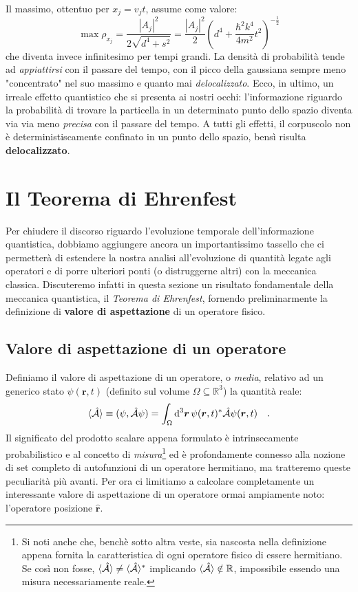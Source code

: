 Il massimo, ottentuo per $x_j = v_jt$, assume come valore:
\[
    \max{\rho_{x_j}} = \frac{|A_j|^2}{{2\sqrt{d^4+s^2}}} = \frac{|A_j|^2}{2} \left( d^4 + \frac{\hbar^2k^4}{4m^2}t^2 \right)^{-\frac{1}{2}} 
\]
che diventa invece infinitesimo per tempi grandi. La densità di probabilità tende ad \emph{appiattirsi} con il passare del tempo, con il picco della gaussiana sempre meno "concentrato" nel suo massimo e quanto mai \emph{delocalizzato}. Ecco, in ultimo, un irreale effetto quantistico che si presenta ai nostri occhi: l'informazione riguardo la probabilità di trovare la particella in un determinato punto dello spazio diventa via via meno \emph{precisa} con il passare del tempo. A tutti gli effetti, il corpuscolo non è deterministiscamente confinato in un punto dello spazio, bensì risulta \textbf{delocalizzato}.

\section{Il Teorema di Ehrenfest}
Per chiudere il discorso riguardo l'evoluzione temporale dell'informazione quantistica, dobbiamo aggiungere ancora un importantissimo tassello che ci permetterà di estendere la nostra analisi all'evoluzione di quantità legate agli operatori e di porre ulteriori ponti (o distruggerne altri) con la meccanica classica. Discuteremo infatti in questa sezione un risultato fondamentale della meccanica quantistica, il \textit{Teorema di Ehrenfest}, fornendo preliminarmente la definizione di \textbf{valore di aspettazione} di un operatore fisico.

\subsection{Valore di aspettazione di un operatore}
Definiamo il {valore di aspettazione} di un operatore, o \emph{media}, relativo ad un generico stato $\psi(\bm{r},t)$ (definito sul volume $\Omega \subseteq \mathbb{R}^3$) la quantità reale:
\begin{equation}
        \langle \hat{\mathcal{A}} \rangle \equiv (\psi, \hat{\mathcal{A}} \psi) = \int_\Omega \dd^3{\bm{r}}\,\psi(\bm{r},t)^* \hat{\mathcal{A}}\psi(\bm{r},t) \quad. 
        \label{eq:exp_value}
\end{equation}
Il significato del prodotto scalare appena formulato è intrinsecamente probabilistico e al concetto di \emph{misura}\footnote{Si noti anche che, benchè sotto altra veste, sia nascosta nella definizione appena fornita la caratteristica di ogni operatore fisico di essere hermitiano. Se così non fosse, $\langle \hat{\mathcal{A}} \rangle \neq \langle \hat{\mathcal{A}} \rangle^*$ implicando $\langle \hat{\mathcal{A}} \rangle \notin \mathbb{R}$, impossibile essendo una misura necessariamente reale.} ed è profondamente connesso alla nozione di set completo di autofunzioni di un operatore hermitiano, ma tratteremo queste peculiarità più avanti. Per ora ci limitiamo a calcolare completamente un interessante valore di aspettazione di un operatore ormai ampiamente noto: l'operatore posizione $\hat{\bm{r}}$.

